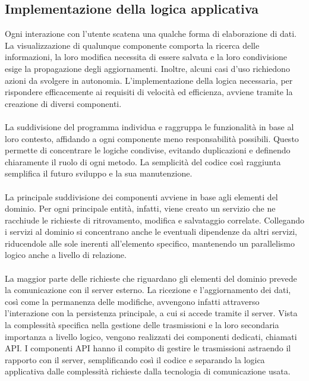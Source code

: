 \clearpage

\subsection{Implementazione della logica applicativa}

Ogni interazione con l'utente scatena una qualche forma di elaborazione di dati.
La visualizzazione di qualunque componente comporta la ricerca delle informazioni,
la loro modifica necessita di essere salvata e
la loro condivisione esige la propagazione degli aggiornamenti.
Inoltre, alcuni casi d'uso richiedono azioni da svolgere in autonomia.
L'implementazione della logica necessaria,
per rispondere efficacemente ai requisiti di velocità ed efficienza,
avviene tramite la creazione di diversi componenti.\\
\\
La suddivisione del programma individua e raggruppa le funzionalità in base al loro contesto,
affidando a ogni componente meno responsabilità possibili.
Questo permette di concentrare le logiche condivise,
evitando duplicazioni e definendo chiaramente il ruolo di ogni metodo.
La semplicità del codice così raggiunta semplifica il futuro sviluppo e la sua manutenzione.\\
\\
La principale suddivisione dei componenti avviene in base agli elementi del dominio.
Per ogni principale entità, infatti, viene creato un servizio che ne racchiude
le richieste di ritrovamento, modifica e salvataggio correlate.
Collegando i servizi al dominio si concentrano anche le eventuali dipendenze da altri servizi,
riducendole alle sole inerenti all'elemento specifico,
mantenendo un parallelismo logico anche a livello di relazione.\\
\\
La maggior parte delle richieste 
che riguardano gli elementi del dominio prevede
la comunicazione con il server esterno.
La ricezione e l'aggiornamento dei dati,
così come la permanenza delle modifiche,
avvengono infatti attraverso l'interazione con la persistenza principale, 
a cui si accede tramite il server.
Vista la complessità specifica nella gestione delle trasmissioni e
la loro secondaria importanza a livello logico,
vengono realizzati dei componenti dedicati, chiamati API.
I componenti API hanno il compito di gestire le trasmissioni 
astraendo il rapporto con il server,
semplificando così il codice e separando la logica applicativa 
dalle complessità richieste dalla tecnologia di comunicazione usata.


